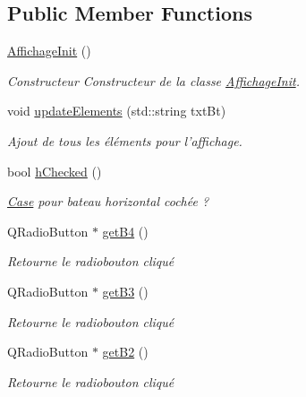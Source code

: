 \subsection*{Public Member Functions}
\begin{DoxyCompactItemize}
\item 
\hypertarget{classAffichageInit_a5edfda4c52c2c15fbb9ee87112deebe4}{\hyperlink{classAffichageInit_a5edfda4c52c2c15fbb9ee87112deebe4}{Affichage\+Init} ()}\label{classAffichageInit_a5edfda4c52c2c15fbb9ee87112deebe4}

\begin{DoxyCompactList}\small\item\em Constructeur Constructeur de la classe \hyperlink{classAffichageInit}{Affichage\+Init}. \end{DoxyCompactList}\item 
void \hyperlink{classAffichageInit_ad8af1158fc6b73fa42817d3f610a82c5}{update\+Elements} (std\+::string txt\+Bt)
\begin{DoxyCompactList}\small\item\em Ajout de tous les éléments pour l'affichage. \end{DoxyCompactList}\item 
bool \hyperlink{classAffichageInit_a2cc64639534b8088912c64d733937508}{h\+Checked} ()
\begin{DoxyCompactList}\small\item\em \hyperlink{classCase}{Case} pour bateau horizontal cochée ? \end{DoxyCompactList}\item 
Q\+Radio\+Button $\ast$ \hyperlink{classAffichageInit_a5c268472841e36e713ea27c1675c6e11}{get\+B4} ()
\begin{DoxyCompactList}\small\item\em Retourne le radiobouton cliqué \end{DoxyCompactList}\item 
Q\+Radio\+Button $\ast$ \hyperlink{classAffichageInit_acb11d9f4409fabf79a63b0a3362ffdbb}{get\+B3} ()
\begin{DoxyCompactList}\small\item\em Retourne le radiobouton cliqué \end{DoxyCompactList}\item 
Q\+Radio\+Button $\ast$ \hyperlink{classAffichageInit_a6f5a1714feffff2e93cb7d80509576ff}{get\+B2} ()
\begin{DoxyCompactList}\small\item\em Retourne le radiobouton cliqué \end{DoxyCompactList}\item 

\end{DoxyCompactItemize}
